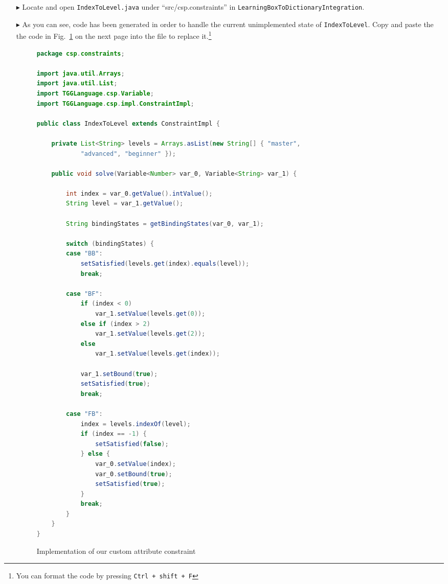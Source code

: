 \begin{itemize}
\item[$\blacktriangleright$] Locate and open \texttt{IndexToLevel.java} under ``src/csp.constraints'' in \texttt{LearningBoxToDictionaryIntegration}.

\item[$\blacktriangleright$] As you can see, code has been generated in order to handle the current unimplemented state of \texttt{IndexToLevel}. Copy
and paste the the code in Fig.~\ref{fig:indexToLevel} on the next page into the file to replace it.\footnote{You can format the code by pressing
\texttt{Ctrl + shift + F}}

\begin{figure}[htbp]
\begin{center}
\begin{lstlisting}[language=Java,backgroundcolor=\color{white}, keywordstyle={\bfseries\color{purple}}]
package csp.constraints;

import java.util.Arrays;
import java.util.List;
import TGGLanguage.csp.Variable;
import TGGLanguage.csp.impl.ConstraintImpl;

public class IndexToLevel extends ConstraintImpl {

	private List<String> levels = Arrays.asList(new String[] { "master",
			"advanced", "beginner" });

	public void solve(Variable<Number> var_0, Variable<String> var_1) {

		int index = var_0.getValue().intValue();
		String level = var_1.getValue();

		String bindingStates = getBindingStates(var_0, var_1);

		switch (bindingStates) {
		case "BB":
			setSatisfied(levels.get(index).equals(level));
			break;

		case "BF":
			if (index < 0)
				var_1.setValue(levels.get(0));
			else if (index > 2)
				var_1.setValue(levels.get(2));
			else
				var_1.setValue(levels.get(index));

			var_1.setBound(true);
			setSatisfied(true);
			break;

		case "FB":
			index = levels.indexOf(level);
			if (index == -1) {
				setSatisfied(false);
			} else {
				var_0.setValue(index);
				var_0.setBound(true);
				setSatisfied(true);
			}
			break;
		}
	}
}
\end{lstlisting}
  \caption{Implementation of our custom attribute constraint}
  \label{fig:indexToLevel}
\end{center}
\end{figure}


\end{itemize}
